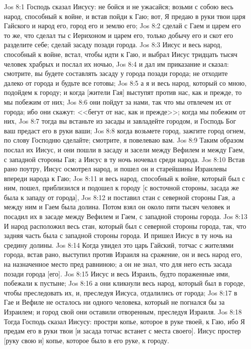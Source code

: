 \vs Jos 8:1 Господь сказал Иисусу: не бойся и не ужасайся; возьми с собою весь народ, способный к войне, и встав пойди к Гаю; вот, Я предаю в руки твои царя Гайского и народ его, город его и землю его;
\vs Jos 8:2 сделай с Гаем и царем его то же, что сделал ты с Иерихоном и царем его, только добычу его и скот его разделите себе; сделай засаду позади города.
\rsbpar\vs Jos 8:3 Иисус и весь народ, способный к войне, встал, чтобы идти к Гаю, и выбрал Иисус тридцать тысяч человек храбрых и послал их ночью,
\vs Jos 8:4 и дал им приказание и сказал: смотрите, вы будете составлять засаду у города позади города; не отходите далеко от города и будьте все готовы;
\vs Jos 8:5 а я и весь народ, который со мною, подойдем к городу; и когда [жители Гая] выступят против нас, как и прежде, то мы побежим от них;
\vs Jos 8:6 они пойдут за нами, так что мы отвлечем их от города; ибо они скажут: <<бегут от нас, как и прежде>>; когда мы побежим от них,
\vs Jos 8:7 тогда вы встаньте из засады и завладейте городом, и Господь Бог ваш предаст его в руки ваши;
\vs Jos 8:8 когда возьмете город, зажгите город огнем, по слову Господню сделайте; смотрите, я повелеваю вам.
\vs Jos 8:9 Таким образом послал их Иисус, и они пошли в засаду и засели между Вефилем и между Гаем, с западной стороны Гая; а Иисус в ту ночь ночевал среди народа.
\rsbpar\vs Jos 8:10 Встав рано поутру, Иисус осмотрел народ, и пошел он и старейшины Израилевы впереди народа к Гаю;
\vs Jos 8:11 и весь народ, способный к войне, который был с ним, пошел, приблизился и подошел к городу [с восточной стороны, засада же была к западу от города],
\vs Jos 8:12 и поставил стан с северной стороны Гая, а между ним и Гаем была долина. Потом взял он около пяти тысяч человек и посадил их в засаде между Вефилем и Гаем, с западной стороны города.
\vs Jos 8:13 И народ расположил весь стан, который был с северной стороны города, так, что задняя часть была с западной стороны города. И пришел Иисус в ту ночь на средину долины.
\vs Jos 8:14 Когда увидел это царь Гайский, тотчас с жителями города, встав рано, выступил против Израиля на сражение, он и весь народ его, на назначенное место пред равниною; а он не знал, что для него есть засада позади города [его].
\vs Jos 8:15 Иисус и весь Израиль, будто пораженные ими, побежали к пустыне;
\vs Jos 8:16 а они кликнули весь народ, который был в городе, чтобы преследовать их, и, преследуя Иисуса, отдалились от города;
\vs Jos 8:17 в Гае и Вефиле не осталось ни одного человека, который не погнался бы за Израилем; и город свой они оставили отворенным, преследуя Израиля.
\vs Jos 8:18 Тогда Господь сказал Иисусу: простри копье, которое в руке твоей, к Гаю, ибо Я предам его в руки твои [и засада тотчас встанет с места своего]. Иисус простер [руку свою и] копье, которое было в его руке, к городу.
